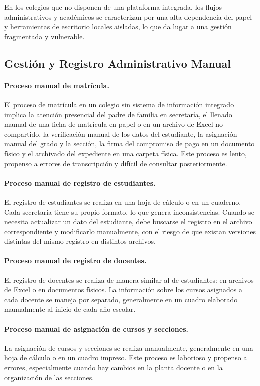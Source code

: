 \documentclass[12pt,a4paper,oneside]{report}
\begin{document}
En los colegios que no disponen de una plataforma integrada, los flujos administrativos y académicos se caracterizan por una alta dependencia del papel y herramientas de escritorio locales aisladas, lo que da lugar a una gestión fragmentada y vulnerable.

\subsection{Gestión y Registro Administrativo Manual}

\paragraph{Proceso manual de matrícula.} El proceso de matrícula en un colegio sin sistema de información integrado implica la atención presencial del padre de familia en secretaría, el llenado manual de una ficha de matrícula en papel o en un archivo de Excel no compartido, la verificación manual de los datos del estudiante, la asignación manual del grado y la sección, la firma del compromiso de pago en un documento físico y el archivado del expediente en una carpeta física. Este proceso es lento, propenso a errores de transcripción y difícil de consultar posteriormente.

\paragraph{Proceso manual de registro de estudiantes.} El registro de estudiantes se realiza en una hoja de cálculo o en un cuaderno. Cada secretaria tiene su propio formato, lo que genera inconsistencias. Cuando se necesita actualizar un dato del estudiante, debe buscarse el registro en el archivo correspondiente y modificarlo manualmente, con el riesgo de que existan versiones distintas del mismo registro en distintos archivos.

\paragraph{Proceso manual de registro de docentes.} El registro de docentes se realiza de manera similar al de estudiantes: en archivos de Excel o en documentos físicos. La información sobre los cursos asignados a cada docente se maneja por separado, generalmente en un cuadro elaborado manualmente al inicio de cada año escolar.

\paragraph{Proceso manual de asignación de cursos y secciones.} La asignación de cursos y secciones se realiza manualmente, generalmente en una hoja de cálculo o en un cuadro impreso. Este proceso es laborioso y propenso a errores, especialmente cuando hay cambios en la planta docente o en la organización de las secciones.
\end{document}
